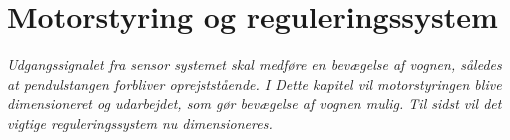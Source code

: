 \chapter{Motorstyring og reguleringssystem}\label{chap:motor_reg}

\emph{Udgangssignalet fra sensor systemet skal medføre en bevægelse af vognen, således at pendulstangen forbliver oprejststående. I Dette kapitel vil motorstyringen blive dimensioneret og udarbejdet, som gør bevægelse af vognen mulig. Til sidst vil det vigtige reguleringssystem nu dimensioneres. }